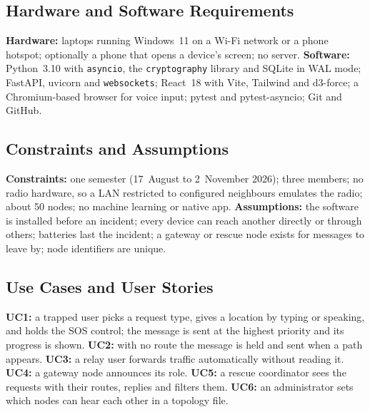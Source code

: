 \subsection{Hardware and Software Requirements}
\textbf{Hardware:} laptops running Windows~11 on a Wi-Fi network or a phone hotspot; optionally a phone that opens a device's screen; no server. \textbf{Software:} Python~3.10 with \texttt{asyncio}, the \texttt{cryptography} library and SQLite in WAL mode; FastAPI, uvicorn and \texttt{websockets}; React~18 with Vite, Tailwind and d3-force; a Chromium-based browser for voice input; pytest and pytest-asyncio; Git and GitHub.

\subsection{Constraints and Assumptions}
\textbf{Constraints:} one semester (17~August to 2~November 2026); three members; no radio hardware, so a LAN restricted to configured neighbours emulates the radio; about 50 nodes; no machine learning or native app. \textbf{Assumptions:} the software is installed before an incident; every device can reach another directly or through others; batteries last the incident; a gateway or rescue node exists for messages to leave by; node identifiers are unique.
\subsection{Use Cases and User Stories}
\textbf{UC1:} a trapped user picks a request type, gives a location by typing or speaking, and holds the SOS control; the message is sent at the highest priority and its progress is shown. \textbf{UC2:} with no route the message is held and sent when a path appears. \textbf{UC3:} a relay user forwards traffic automatically without reading it. \textbf{UC4:} a gateway node announces its role. \textbf{UC5:} a rescue coordinator sees the requests with their routes, replies and filters them. \textbf{UC6:} an administrator sets which nodes can hear each other in a topology file.
